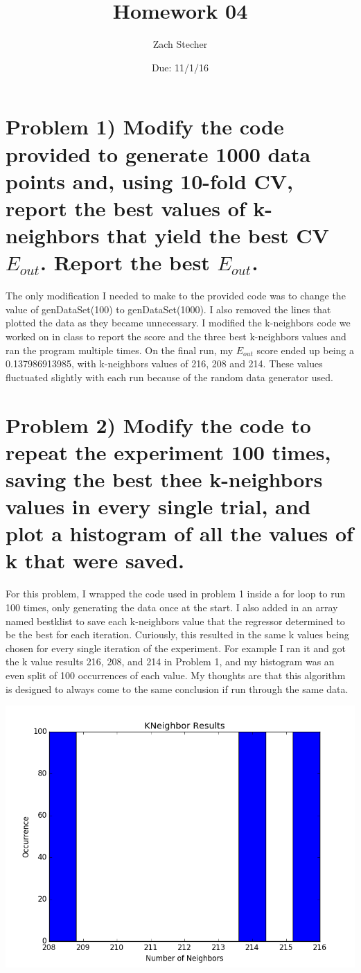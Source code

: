 \documentclass[11pt]{article}
\title{Homework 04}
\author{Zach Stecher}
\date{Due: 11/1/16}
\begin{document}
\maketitle

\section*{Problem 1) Modify the code provided to generate 1000 data points and, using 10-fold CV, report the best values of k-neighbors that yield the best CV $E_{out}$. Report the best $E_{out}$.}

The only modification I needed to make to the provided code was to change the value of genDataSet(100) to genDataSet(1000). I also removed the lines that plotted the data as they became unnecessary. I modified the k-neighbors code we worked on in class to report the score and the three best k-neighbors values and ran the program multiple times. On the final run, my $E_{out}$ score ended up being a 0.137986913985, with k-neighbors values of 216, 208 and 214. These values fluctuated slightly with each run because of the random data generator used.

\section*{Problem 2) Modify the code to repeat the experiment 100 times, saving the best thee k-neighbors values in every single trial, and plot a histogram of all the values of k that were saved.}

For this problem, I wrapped the code used in problem 1 inside a for loop to run 100 times, only generating the data once at the start. I also added in an array named bestklist to save each k-neighbors value that the regressor determined to be the best for each iteration. Curiously, this resulted in the same k values being chosen for every single iteration of the experiment. For example I ran it and got the k value results 216, 208, and 214 in Problem 1, and my histogram was an even split of 100 occurrences of each value. My thoughts are that this algorithm is designed to always come to the same conclusion if run through the same data.

\includegraphics{kneighhistogram.png}
\end{document}
